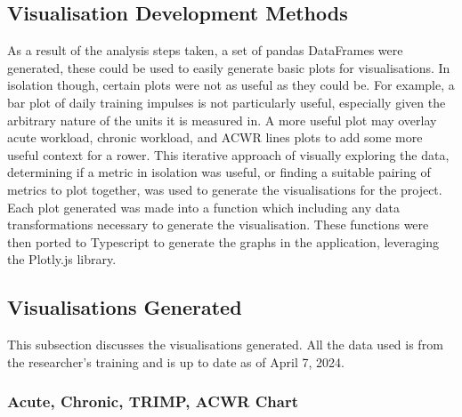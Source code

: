 \subsection{Visualisation Development Methods}
As a result of the analysis steps taken, a set of pandas DataFrames were generated, these could be used to easily generate basic plots for visualisations. In isolation though, certain plots were not as useful as they could be. For example, a bar plot of daily training impulses is not particularly useful, especially given the arbitrary nature of the units it is measured in. A more useful plot may overlay acute workload, chronic workload, and ACWR lines plots to add some more useful context for a rower. This iterative approach of visually exploring the data, determining if a metric in isolation was useful, or finding a suitable pairing of metrics to plot together, was used to generate the visualisations for the project. Each plot generated was made into a function which including any data transformations necessary to generate the visualisation. These functions were then ported to Typescript to generate the graphs in the application, leveraging the Plotly.js library.

\subsection{Visualisations Generated}
This subsection discusses the visualisations generated. All the data used is from the researcher's training and is up to date as of April 7, 2024.

\subsubsection{Acute, Chronic, TRIMP, ACWR Chart}

